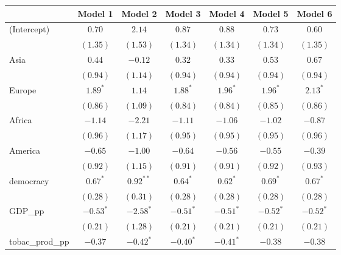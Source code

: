 
\begin{table}[!h]
\begin{center}
\begin{tabular}{l c c c c c c }
\toprule
 & Model 1 & Model 2 & Model 3 & Model 4 & Model 5 & Model 6 \\
\midrule
(Intercept)             & $0.70$       & $2.14$       & $0.87$       & $0.88$       & $0.73$       & $0.60$       \\
                        & $(1.35)$     & $(1.53)$     & $(1.34)$     & $(1.34)$     & $(1.34)$     & $(1.35)$     \\
Asia                    & $0.44$       & $-0.12$      & $0.32$       & $0.33$       & $0.53$       & $0.67$       \\
                        & $(0.94)$     & $(1.14)$     & $(0.94)$     & $(0.94)$     & $(0.94)$     & $(0.94)$     \\
Europe                  & $1.89^{*}$   & $1.14$       & $1.88^{*}$   & $1.96^{*}$   & $1.96^{*}$   & $2.13^{*}$   \\
                        & $(0.86)$     & $(1.09)$     & $(0.84)$     & $(0.84)$     & $(0.85)$     & $(0.86)$     \\
Africa                  & $-1.14$      & $-2.21$      & $-1.11$      & $-1.06$      & $-1.02$      & $-0.87$      \\
                        & $(0.96)$     & $(1.17)$     & $(0.95)$     & $(0.95)$     & $(0.95)$     & $(0.96)$     \\
America                 & $-0.65$      & $-1.00$      & $-0.64$      & $-0.56$      & $-0.55$      & $-0.39$      \\
                        & $(0.92)$     & $(1.15)$     & $(0.91)$     & $(0.91)$     & $(0.92)$     & $(0.93)$     \\
democracy               & $0.67^{*}$   & $0.92^{**}$  & $0.64^{*}$   & $0.62^{*}$   & $0.69^{*}$   & $0.67^{*}$   \\
                        & $(0.28)$     & $(0.31)$     & $(0.28)$     & $(0.28)$     & $(0.28)$     & $(0.28)$     \\
GDP\_pp                 & $-0.53^{*}$  & $-2.58^{*}$  & $-0.51^{*}$  & $-0.51^{*}$  & $-0.52^{*}$  & $-0.52^{*}$  \\
                        & $(0.21)$     & $(1.28)$     & $(0.21)$     & $(0.21)$     & $(0.21)$     & $(0.21)$     \\
tobac\_prod\_pp         & $-0.37$      & $-0.42^{*}$  & $-0.40^{*}$  & $-0.41^{*}$  & $-0.38$      & $-0.38$      \\

\end{tabular}
\end{center}
\end{table}
